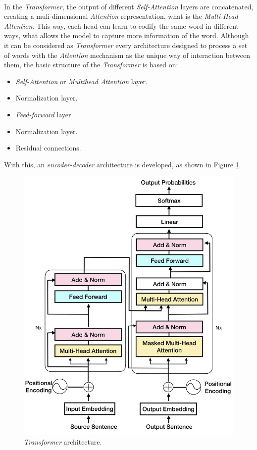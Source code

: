 \paragraph{}
In the \emph{Transformer}, the output of different \emph{Self-Attention} layers are concatenated, creating a muli-dimensional \emph{Attention} representation, what is the \emph{Multi-Head Attention}. This way, each head can learn to codify the same word in different ways, what allows the model to capture more information of the word. Although it can be considered as \emph{Transformer} every architecture designed to process a set of words with the \emph{Attention} mechanism as the unique way of interaction between them, the basic structure of the \emph{Transformer} is based on:
\begin{itemize}
\item \emph{Self-Attention} or \emph{Multihead Attention} layer.
\item Normalization layer.
\item \emph{Feed-forward} layer.
\item Normalization layer.
\item Residual connections.
\end{itemize}
With this, an \emph{encoder-decoder} architecture is developed, as shown in Figure \ref{fig:transformer}.
\begin{figure}[h!]
	\centering
	\includegraphics[scale=0.25]{images/transformer}
	\caption{\emph{Transformer} architecture.}
	\label{fig:transformer}
\end{figure}
